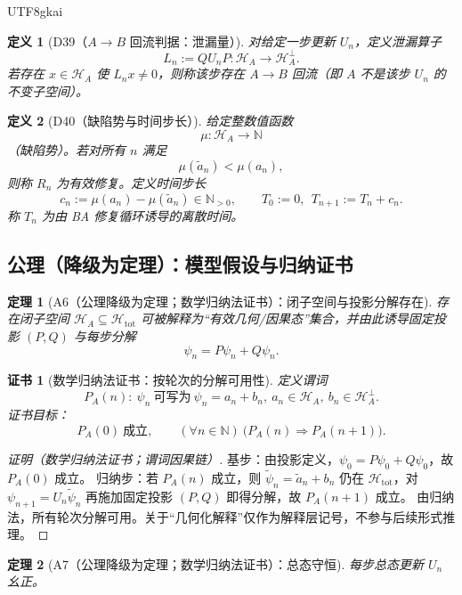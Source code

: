 \documentclass[12pt]{article}
\newtheorem{definition}{定义}[section]
\newtheorem{theorem}{定理}[section]
\newtheorem{Certificate}{证书}[section]
\begin{document}
\begin{CJK*}{UTF8}{gkai}
\begin{definition}[D39（$A\to B$ 回流判据：泄漏量）]
\label{def:D39}
对给定一步更新 $U_n$，定义泄漏算子
\[
L_n:=QU_nP:\mathcal H_A\to\mathcal H_A^\perp.
\]
若存在 $x\in\mathcal H_A$ 使 $L_nx\neq 0$，则称该步存在 $A\to B$ 回流（即 $A$ 不是该步 $U_n$ 的不变子空间）。
\end{definition}

\begin{definition}[D40（缺陷势与时间步长）]
\label{def:D40}
给定整数值函数
\[
\mu:\mathcal H_A\to\mathbb N
\]
（缺陷势）。若对所有 $n$ 满足
\[
\mu(\tilde a_n)<\mu(a_n),
\]
则称 $R_n$ 为有效修复。定义时间步长
\[
c_n:=\mu(a_n)-\mu(\tilde a_n)\in\mathbb N_{>0},
\qquad
T_0:=0,\ \ T_{n+1}:=T_n+c_n.
\]
称 $T_n$ 为由 BA 修复循环诱导的离散时间。
\end{definition}

\subsection{公理（降级为定理）：模型假设与归纳证书}

\begin{theorem}[A6（公理降级为定理；数学归纳法证书）：闭子空间与投影分解存在]
\label{thm:A6}
存在闭子空间 $\mathcal H_A\subseteq\mathcal H_{\mathrm{tot}}$ 可被解释为“有效几何/因果态”集合，并由此诱导固定投影 $(P,Q)$ 与每步分解
\[
\psi_n=P\psi_n+Q\psi_n.
\]
\end{theorem}

\begin{Certificate}[数学归纳法证书：按轮次的分解可用性]
\label{cert:A6}
定义谓词
\[
P_A(n):\ \psi_n\ \text{可写为}\ \psi_n=a_n+b_n,\ a_n\in\mathcal H_A,\ b_n\in\mathcal H_A^\perp.
\]
证书目标：
\[
P_A(0)\ \text{成立},\qquad (\forall n\in\mathbb N)\ \bigl(P_A(n)\Rightarrow P_A(n+1)\bigr).
\]
\end{Certificate}

\begin{proof}[证明（数学归纳法证书；谓词因果链）]
基步：由投影定义，$\psi_0=P\psi_0+Q\psi_0$，故 $P_A(0)$ 成立。
归纳步：若 $P_A(n)$ 成立，则 $\tilde\psi_n=\tilde a_n+b_n$ 仍在 $\mathcal H_{\mathrm{tot}}$，对 $\psi_{n+1}=U_n\tilde\psi_n$ 再施加固定投影
  $(P,Q)$ 即得分解，故 $P_A(n+1)$ 成立。
由归纳法，所有轮次分解可用。关于“几何化解释”仅作为解释层记号，不参与后续形式推理。
\end{proof}

\begin{theorem}[A7（公理降级为定理；数学归纳法证书）：总态守恒]
\label{thm:A7}
每步总态更新 $U_n$ 幺正。
\end{theorem}


\end{CJK*}
\end{document}
